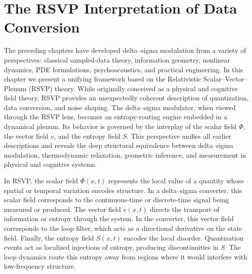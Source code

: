 
\chapter{The RSVP Interpretation of Data Conversion}

The preceding chapters have developed delta–sigma modulation from a variety of perspectives: classical sampled-data theory, information geometry, nonlinear dynamics, PDE formulations, psychoacoustics, and practical engineering. In this chapter we present a unifying framework based on the Relativistic Scalar–Vector–Plenum (RSVP) theory. While originally conceived as a physical and cognitive field theory, RSVP provides an unexpectedly coherent description of quantization, data conversion, and noise shaping. The delta–sigma modulator, when viewed through the RSVP lens, becomes an entropy-routing engine embedded in a dynamical plenum. Its behavior is governed by the interplay of the scalar field \(\Phi\), the vector field \(v\), and the entropy field \(S\). This perspective unifies all earlier descriptions and reveals the deep structural equivalence between delta–sigma modulation, thermodynamic relaxation, geometric inference, and measurement in physical and cognitive systems.

In RSVP, the scalar field \(\Phi(x,t)\) represents the local value of a quantity whose spatial or temporal variation encodes structure. In a delta–sigma converter, this scalar field corresponds to the continuous-time or discrete-time signal being measured or produced. The vector field \(v(x,t)\) directs the transport of information or entropy through the system. In the converter, this vector field corresponds to the loop filter, which acts as a directional derivative on the state field. Finally, the entropy field \(S(x,t)\) encodes the local disorder. Quantization events act as localized injections of entropy, producing discontinuities in \(S\). The loop dynamics route this entropy away from regions where it would interfere with low-frequency structure.

